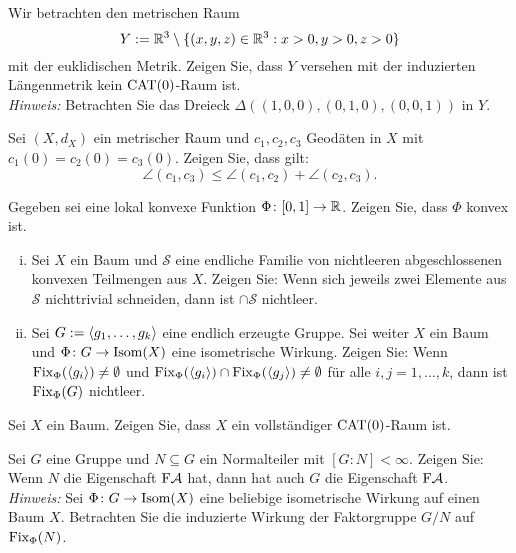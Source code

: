 	\begin{aufgabe}
		\label{aufg:6.3}
		Wir betrachten den metrischen Raum
		\[
			Y := \mathbb{R}^3 \setminus \{(x,y,z) \in \mathbb{R}^3 : x > 0, y>0, z >0\}
		\]
		mit der euklidischen Metrik.
		Zeigen Sie, dass $Y$ versehen mit der induzierten Längenmetrik kein $\operatorname{CAT(0)}$-Raum ist. \\
		\textit{Hinweis:} Betrachten Sie das Dreieck $\Delta((1,0,0),(0,1,0),(0,0,1))$ in $Y$.
	\end{aufgabe}
	
	\begin{aufgabe}
		\label{aufg:6.4}
		Sei $(X,d_X)$ ein metrischer Raum und $c_1,c_2,c_3$ Geodäten in $X$ mit $c_1(0) = c_2(0) = c_3(0)$.
		Zeigen Sie, dass gilt:
		\[
			\angle(c_1,c_3) \leq \angle(c_1,c_2) + \angle(c_2,c_3).
		\]
	\end{aufgabe}
	
	\begin{aufgabe}
		\label{aufg:7.1}
		Gegeben sei eine lokal konvexe Funktion $\Phi\colon [0,1] \rightarrow \mathbb{R}$.
		Zeigen Sie, dass $\Phi$ konvex ist.
	\end{aufgabe}

	\begin{aufgabe}
		\label{aufg:7.2}
		\begin{enumerate}[(i)]
			\item Sei $X$ ein Baum und $\mathcal{S}$ eine endliche Familie von nichtleeren abgeschlossenen konvexen Teilmengen aus $X$.
			Zeigen Sie:
			Wenn sich jeweils zwei Elemente aus $\mathcal{S}$ nichttrivial schneiden, dann ist $\cap \mathcal{S}$ nichtleer.
			\item Sei $G:= \langle g_1,\dots,g_k\rangle$ eine endlich erzeugte Gruppe.
			Sei weiter $X$ ein Baum und $\Phi \colon G \rightarrow \operatorname{Isom}(X)$ eine isometrische Wirkung.
			Zeigen Sie:
			Wenn $\operatorname{Fix}_\Phi(\langle g_i\rangle) \neq \emptyset$ und $\operatorname{Fix}_\Phi(\langle g_i\rangle) \cap \operatorname{Fix}_\Phi(\langle g_j\rangle) \neq \emptyset$ für alle $i,j = 1,\dots,k$, dann ist $\operatorname{Fix}_\Phi(G)$ nichtleer.
		\end{enumerate}
	\end{aufgabe}
	
	\begin{aufgabe}
		\label{aufg:7.3}
		Sei $X$ ein Baum.
		Zeigen Sie, dass $X$ ein vollständiger $\operatorname{CAT(0)}$-Raum ist.
	\end{aufgabe}
	
	\begin{aufgabe}
		\label{aufg:7.4}
		Sei $G$ eine Gruppe und $N \subseteq G$ ein Normalteiler mit $[G : N] < \infty$.
		Zeigen Sie:
		Wenn $N$ die Eigenschaft $\text{F}\mathcal{A}$ hat, dann hat auch $G$ die Eigenschaft $\text{F}\mathcal{A}$. \\
		\textit{Hinweis:} Sei $\Phi\colon G \rightarrow \operatorname{Isom}(X)$ eine beliebige isometrische Wirkung auf einen Baum $X$.
		Betrachten Sie die induzierte Wirkung der Faktorgruppe $G/N$ auf $\operatorname{Fix}_\Phi(N)$.
	\end{aufgabe}
\cleardoubleemptypage